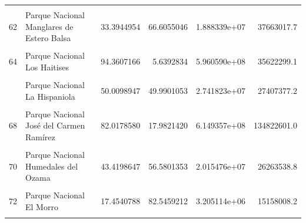 \documentclass[10pt,landscape,a3paper]{article}
\begin{document}
\begin{longtable}[t]{llrrrr}
\addlinespace
\cellcolor{lightgray}{61} & \cellcolor{lightgray}{Parque Nacional Manglares del Bajo Yuna} & \cellcolor{lightgray}{78.3065153} & \cellcolor{lightgray}{21.6934847} & \cellcolor{lightgray}{9.487214e+07} & \cellcolor{lightgray}{26282708.9}\\
62 & Parque Nacional Manglares de Estero Balsa & 33.3944954 & 66.6055046 & 1.888339e+07 & 37663017.7\\
\cellcolor{lightgray}{63} & \cellcolor{lightgray}{Parque Nacional Luis Quin} & \cellcolor{lightgray}{86.8040330} & \cellcolor{lightgray}{13.1959670} & \cellcolor{lightgray}{1.712595e+08} & \cellcolor{lightgray}{26034908.2}\\
64 & Parque Nacional Los Haitises & 94.3607166 & 5.6392834 & 5.960590e+08 & 35622299.1\\
\cellcolor{lightgray}{65} & \cellcolor{lightgray}{Parque Nacional Lago Enriquillo e Isla Cabritos} & \cellcolor{lightgray}{1.6547394} & \cellcolor{lightgray}{98.3452606} & \cellcolor{lightgray}{6.700602e+06} & \cellcolor{lightgray}{398233395.5}\\
\addlinespace
66 & Parque Nacional La Hispaniola & 50.0098947 & 49.9901053 & 2.741823e+07 & 27407377.2\\
\cellcolor{lightgray}{67} & \cellcolor{lightgray}{Parque Nacional La Gran Sabana} & \cellcolor{lightgray}{6.7321418} & \cellcolor{lightgray}{93.2678582} & \cellcolor{lightgray}{1.478217e+07} & \cellcolor{lightgray}{204793812.2}\\
68 & Parque Nacional José del Carmen Ramírez & 82.0178580 & 17.9821420 & 6.149357e+08 & 134822601.0\\
\cellcolor{lightgray}{69} & \cellcolor{lightgray}{Parque Nacional Jaragua} & \cellcolor{lightgray}{31.3660689} & \cellcolor{lightgray}{68.6339311} & \cellcolor{lightgray}{4.814738e+08} & \cellcolor{lightgray}{1053541025.4}\\
70 & Parque Nacional Humedales del Ozama & 43.4198647 & 56.5801353 & 2.015476e+07 & 26263538.8\\
\addlinespace
\cellcolor{lightgray}{71} & \cellcolor{lightgray}{Parque Nacional Francisco Alberto Caamaño Deñó} & \cellcolor{lightgray}{33.6662104} & \cellcolor{lightgray}{66.3337896} & \cellcolor{lightgray}{1.977924e+08} & \cellcolor{lightgray}{389717643.3}\\
72 & Parque Nacional El Morro & 17.4540788 & 82.5459212 & 3.205114e+06 & 15158008.2\\
\cellcolor{lightgray}{73} & \cellcolor{lightgray}{Parque Nacional Cotubanamá (Del Este)} & \cellcolor{lightgray}{47.7556133} & \cellcolor{lightgray}{52.2443867} & \cellcolor{lightgray}{3.803282e+08} & \cellcolor{lightgray}{416077050.5}\\

\end{longtable}
\end{document}
